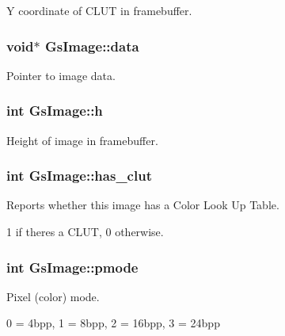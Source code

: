 Y coordinate of C\+L\+U\+T in framebuffer. 

\hypertarget{structGsImage_a911f9bc144bfeb7a1f7a4a761f8107c0}{}
\subsubsection[{data}]{\setlength{\rightskip}{0pt plus 5cm}void$\ast$ Gs\+Image\+::data}\label{structGsImage_a911f9bc144bfeb7a1f7a4a761f8107c0}


Pointer to image data. 

\hypertarget{structGsImage_a833613285c334d6e02dab93a6851ea9e}{}
\subsubsection[{h}]{\setlength{\rightskip}{0pt plus 5cm}int Gs\+Image\+::h}\label{structGsImage_a833613285c334d6e02dab93a6851ea9e}


Height of image in framebuffer. 

\hypertarget{structGsImage_a08d650746c51afda8d4e3bca004bba33}{}
\subsubsection[{has\+\_\+clut}]{\setlength{\rightskip}{0pt plus 5cm}int Gs\+Image\+::has\+\_\+clut}\label{structGsImage_a08d650746c51afda8d4e3bca004bba33}


Reports whether this image has a Color Look Up Table. 

1 if there\textquotesingle{}s a C\+L\+U\+T, 0 otherwise. \hypertarget{structGsImage_a2a97f495c717e8dad31ea67e87945f5e}{}
\subsubsection[{pmode}]{\setlength{\rightskip}{0pt plus 5cm}int Gs\+Image\+::pmode}\label{structGsImage_a2a97f495c717e8dad31ea67e87945f5e}


Pixel (color) mode. 

0 = 4bpp, 1 = 8bpp, 2 = 16bpp, 3 = 24bpp \hypertarget{structGsImage_a9161db2be29ff2caf39a9b8fea7256fc}{}
